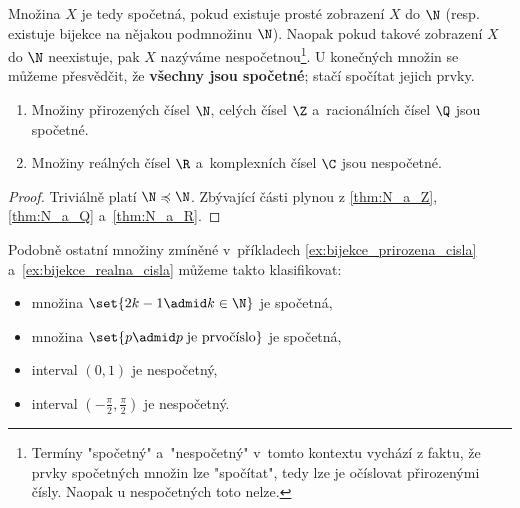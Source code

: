Množina $X$ je tedy spočetná, pokud existuje prosté zobrazení $X$ do $\N$ (resp. existuje bijekce na nějakou podmnožinu $\N$). Naopak pokud takové zobrazení $X$ do $\N$ neexistuje, pak $X$ nazýváme nespočetnou\footnote{Termíny "spočetný" a~"nespočetný" v~tomto kontextu vychází z faktu, že prvky spočetných množin lze "spočítat", tedy lze je očíslovat přirozenými čísly. Naopak u nespočetných toto nelze.}. U konečných množin se můžeme přesvědčit, že \textbf{všechny jsou spočetné}; stačí spočítat jejich prvky.
\begin{theorem}\label{thm:spocetnost_ciselnych_oboru}
    \begin{enumerate}[label=(\roman*)]
        \item Množiny přirozených čísel $\N$, celých čísel $\Z$ a~racionálních čísel $\Q$ jsou spočetné.
        \item Množiny reálných čísel $\R$ a~komplexních čísel $\C$ jsou nespočetné.
    \end{enumerate}
\end{theorem}
\begin{proof}
    Triviálně platí $\N\preccurlyeq\N$. Zbývající části plynou z \ref{thm:N_a_Z}, \ref{thm:N_a_Q} a~\ref{thm:N_a_R}.
\end{proof}
Podobně ostatní množiny zmíněné v~příkladech \ref{ex:bijekce_prirozena_cisla} a~\ref{ex:bijekce_realna_cisla} můžeme takto klasifikovat:
\begin{itemize}
    \item množina $\set{2k-1 \admid k\in\N}$ je spočetná,
    \item množina $\set{p \admid p\;\text{je prvočíslo}}$ je spočetná,
    \item interval $(0,1)$ je nespočetný,
    \item interval $\displaystyle\left(-\frac{\pi}{2},\frac{\pi}{2}\right)$ je nespočetný.
\end{itemize}
\medskip

